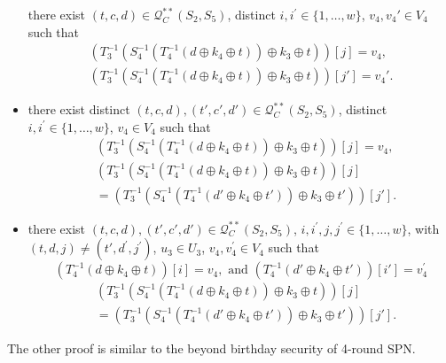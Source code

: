 \begin{itemize}
  there exist $(t, c, d) \in \mathcal{Q}_{C}^{**}\left(S_{2}, S_{5}\right)$, distinct $i, i^{\prime}\in\{1, \ldots, w\}$, $v_{4},v_{4}' \in V_{4}$ such that
  $$
  \begin{aligned}  
  \left(T_{3}^{-1}\left(S_{4}^{-1}\left(T_{4}^{-1}\left(d \oplus k_{4} \oplus t\right)\right) \oplus k_{3} \oplus t\right)\right)[j] = v_4, \\
  \left(T_{3}^{-1}\left(S_{4}^{-1}\left(T_{4}^{-1}\left(d \oplus k_{4} \oplus t\right)\right) \oplus k_{3} \oplus t\right)\right)[j'] = v_4'.
  \end{aligned}
  $$
  \item[\feaviii]
  there exist distinct $(t, c, d),(t', c', d') \in \mathcal{Q}_{C}^{**}\left(S_{2}, S_{5}\right)$, distinct $i, i^{\prime}\in\{1, \ldots, w\}$, $v_{4} \in V_{4}$ such that
  $$
  \begin{aligned}
  &\left(T_{3}^{-1}\left(S_{4}^{-1}\left(T_{4}^{-1}\left(d \oplus k_{4} \oplus t\right)\right) \oplus k_{3} \oplus t\right)\right)[j] = v_4, \\
  &\left(T_{3}^{-1}\left(S_{4}^{-1}\left(T_{4}^{-1}\left(d \oplus k_{4} \oplus t\right)\right) \oplus k_{3} \oplus t\right)\right)[j]\\
  &=\left(T_{3}^{-1}\left(S_{4}^{-1}\left(T_{4}^{-1}\left(d' \oplus k_{4} \oplus t'\right)\right) \oplus k_{3} \oplus t'\right)\right)[j'].
  \end{aligned}
  $$
  \item[\feaviiii]
  there exist $(t, c, d), (t', c', d') \in \mathcal{Q}_{C}^{**}\left(S_{2}, S_{5}\right)$, $i, i^{\prime}, j, j^{\prime} \in\{1, \ldots, w\}$, with$(t, d, j) \neq \left(t', d^{\prime}, j^{\prime}\right)$, $u_{3} \in U_{3}$, $v_{4},v_{4}^{\prime} \in V_{4}$ such that 
  $$
  \left(T_{4}^{-1}\left(d \oplus k_{4} \oplus t\right)\right)[i] = v_4, \text{ and }
  \left(T_{4}^{-1}\left(d' \oplus k_{4} \oplus t'\right)\right)[i'] = v_4^{\prime}
  $$ 
  $$
\begin{aligned}
  &\left(T_{3}^{-1}\left(S_{4}^{-1}\left(T_{4}^{-1}\left(d \oplus k_{4} \oplus t\right)\right) \oplus k_{3} \oplus t\right)\right)[j] \\
  &=  \left(T_{3}^{-1}\left(S_{4}^{-1}\left(T_{4}^{-1}\left(d' \oplus k_{4} \oplus t'\right)\right) \oplus k_{3} \oplus t'\right)\right)[j'].
\end{aligned}
$$
\end{itemize}

\noindent The other proof is similar to the beyond birthday security of 4-round SPN. 


















